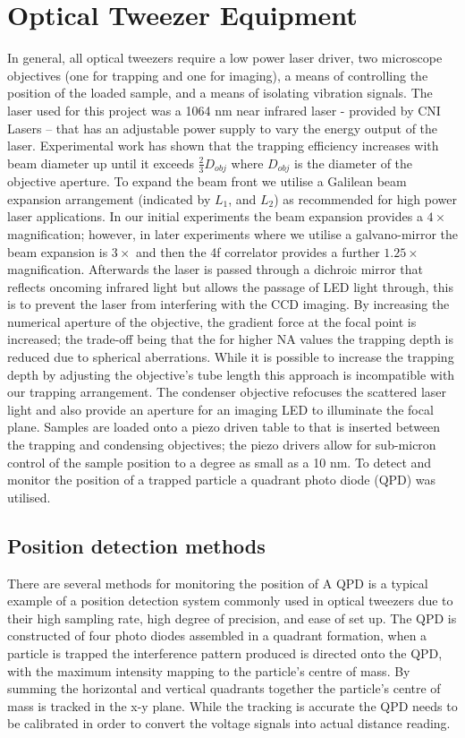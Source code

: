 \documentclass[a4paper,oneside,11pt]{book}
\begin{document}
\section{Optical Tweezer Equipment}
In general, all optical tweezers require a low power laser driver, two microscope objectives (one for trapping and one for imaging), a means of controlling the position of the loaded sample, and a means of isolating vibration signals. The laser used for this project was a 1064 nm near infrared laser - provided by CNI Lasers – that has an adjustable power supply to vary the energy output of the laser. Experimental work has shown that the trapping efficiency increases with beam diameter up until it exceeds $\frac{2}{3}D_{obj}$ where $D_{obj}$ is the diameter of the objective aperture. To expand the beam front we utilise a Galilean beam expansion arrangement (indicated by $L_1$, and $L_2$) as recommended for high power laser applications. In our initial experiments the beam expansion provides a $4\times$ magnification; however, in later experiments where we utilise a galvano-mirror the beam expansion is $3\times$ and then the 4f correlator provides a further $1.25\times$ magnification. Afterwards the laser is passed through a dichroic mirror that reflects oncoming infrared light but allows the passage of LED light through, this is to prevent the laser from interfering with the CCD imaging. By increasing the numerical aperture of the objective, the gradient force at the focal point is increased; the trade-off being that the for higher NA values the trapping depth is reduced due to spherical aberrations. While it is possible to increase the trapping depth by adjusting the objective's tube length this approach is incompatible with our trapping arrangement. The condenser objective refocuses the scattered laser light and also provide an aperture for an imaging LED to illuminate the focal plane. Samples are loaded onto a piezo driven table to that is inserted between the trapping and condensing objectives; the piezo drivers allow for sub-micron control of the sample position to a degree as small as a 10 nm. To detect and monitor the position of a trapped particle a quadrant photo diode (QPD) was utilised. 

\subsection{Position detection methods}
There are several methods for monitoring the position of 
A QPD is a typical example of a position detection system commonly used 
in optical tweezers due to their high sampling rate, high degree of 
precision, and ease of set up. The QPD is constructed of four photo 
diodes assembled in a quadrant formation, when a particle is trapped the 
interference pattern produced is directed onto the QPD, with the maximum 
intensity mapping to the particle's centre of mass. By summing the 
horizontal and vertical quadrants together the particle's centre of mass 
is tracked in the x-y plane. While the tracking is accurate the QPD 
needs to be calibrated in order to convert the voltage signals into 
actual distance reading. 
\end{document}
